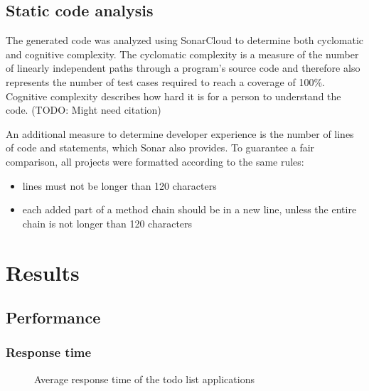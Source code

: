 \documentclass[a4paper,titlepage]{article}
\begin{document}
\subsection{Static code analysis}
The generated code was analyzed using SonarCloud to determine both cyclomatic
and cognitive complexity. The cyclomatic complexity is a measure of the number
of linearly independent paths through a program's source code and therefore also
represents the number of test cases required to reach a coverage of 100\%.
Cognitive complexity describes how hard it is for a person to understand the
code. (TODO: Might need citation) \newline

\noindent An additional measure to determine developer experience is the number
of lines of code and statements, which Sonar also provides. To guarantee a fair
comparison, all projects were formatted according to the same rules:

\begin{itemize}
	\item lines must not be longer than 120 characters
	\item each added part of a method chain should be in a new line, unless
	      the entire chain is not longer than 120 characters
\end{itemize}

\section{Results}
\subsection{Performance}
\subsubsection{Response time}
\begin{figure}[H]
	\centering
	\caption{
		Average response time of the todo list applications
	}
\end{figure}
\end{document}

